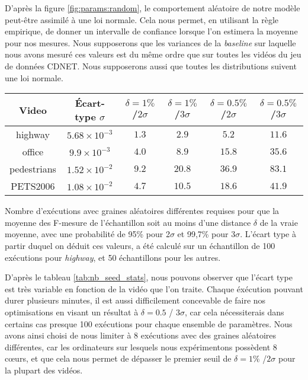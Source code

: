 	D'après la figure \ref{fig:params:random}, le comportement aléatoire de notre modèle peut-être assimilé à une loi normale. Cela nous permet, en utilisant la règle empirique, de donner un intervalle de confiance lorsque l'on estimera la moyenne pour nos mesures. Nous supposerons que les variances de la \textit{baseline} sur laquelle nous avons mesuré ces valeurs est du même ordre que sur toutes les vidéos du jeu de données CDNET. Nous supposerons aussi que toutes les distributions suivent une loi normale.

	\begin{tableth}
	\begin{tabular}{|c|c|cccc|}
		\hline
		Video	& Écart-type $\sigma$& $\delta=1\%$ /$2\sigma$ & $\delta=1\%$ /$3\sigma$ & $\delta=0.5\%$ /$2\sigma$ & $\delta=0.5\%$ /$3\sigma$\\
		\hline
		highway & $5.68 \times 10^{-3}$ & $1.3$ & $2.9$ & $5.2$ & $11.6$\\
		office & $9.9 \times 10^{-3}$ & $4.0$ & $8.9$ & $15.8$ & $35.6$\\
		pedestrians & $1.52 \times 10^{-2}$ & $9.2$ & $20.8$ & $36.9$ & $83.1$\\
		PETS2006 & $1.08 \times 10^{-2}$ & $4.7$ & $10.5$ & $18.6$ & $41.9$\\
		\hline
	\end{tabular}
	\caption[Estimations statistiques du nombre de graines requises]{Nombre d'exécutions avec graines aléatoires différentes requises pour que la moyenne des F-mesure de l'échantillon soit au moins d'une distance $\delta$ de la vraie moyenne, avec une probabilité de 95\% pour 2$\sigma$ et 99,7\% pour 3$\sigma$. L'écart type à partir duquel on déduit ces valeurs, a été calculé sur un échantillon de 100 exécutions pour \textit{highway}, et 50 échantillons pour les autres.} \label{tab:nb_seed_stats}
	\end{tableth}

	D'après le tableau \ref{tab:nb_seed_stats}, nous pouvons observer que l'écart type est très variable en fonction de la vidéo que l'on traite. Chaque éxécution pouvant durer plusieurs minutes, il est aussi difficilement concevable de faire nos optimisations en visant un résultat à $\delta = 0.5$ / $3\sigma$, car cela nécessiterais dans certains cas presque 100 exécutions pour chaque ensemble de paramètres. Nous avons ainsi choisi de nous limiter à 8 exécutions avec des graines aléatoires différentes, car les ordinateurs sur lesquels nous expérimentons possèdent 8 cœurs, et que cela nous permet de dépasser le premier seuil de $\delta=1\%$ /$2\sigma$ pour la plupart des vidéos.

